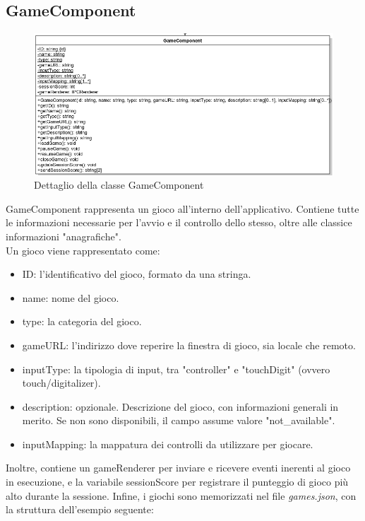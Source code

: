 \subsection{GameComponent}
\begin{figure}[h]
    \centering
    \includegraphics[width=340pt]{ProgettazioneTecnica/Game.png}
    \caption{Dettaglio della classe GameComponent}
    \label{fig:gameComponent}
\end{figure}
GameComponent rappresenta un gioco all'interno dell'applicativo. Contiene tutte le informazioni necessarie per l'avvio e il controllo dello stesso, oltre alle classice informazioni "anagrafiche".\\
Un gioco viene rappresentato come:
\begin{itemize}
    \item ID: l'identificativo del gioco, formato da una stringa.
    \item name: nome del gioco.
    \item type: la categoria del gioco.
    \item gameURL: l'indirizzo dove reperire la finestra di gioco, sia locale che remoto.
    \item inputType: la tipologia di input, tra "controller" e "touchDigit" (ovvero touch/digitalizer).
    \item description: opzionale. Descrizione del gioco, con informazioni generali in merito. Se non sono disponibili, il campo assume valore "not_available".
    \item inputMapping: la mappatura dei controlli da utilizzare per giocare.
\end{itemize}
Inoltre, contiene un gameRenderer per inviare e ricevere eventi inerenti al gioco in esecuzione, e la variabile sessionScore per registrare il punteggio di gioco più alto durante la sessione.
Infine, i giochi sono memorizzati nel file \emph{games.json}, con la struttura dell'esempio seguente:
